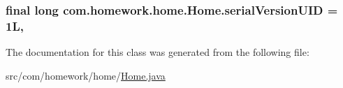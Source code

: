 \subsubsection[{\texorpdfstring{serial\+Version\+U\+ID}{serialVersionUID}}]{\setlength{\rightskip}{0pt plus 5cm}final long com.\+homework.\+home.\+Home.\+serial\+Version\+U\+ID = 1L\hspace{0.3cm}{\ttfamily [static]}, {\ttfamily [private]}}\hypertarget{classcom_1_1homework_1_1home_1_1_home_ab7840589e7705ec054b07f9488dc9b4e}{}\label{classcom_1_1homework_1_1home_1_1_home_ab7840589e7705ec054b07f9488dc9b4e}


The documentation for this class was generated from the following file\+:\begin{DoxyCompactItemize}
\item 
src/com/homework/home/\hyperlink{_home_8java}{Home.\+java}\end{DoxyCompactItemize}
